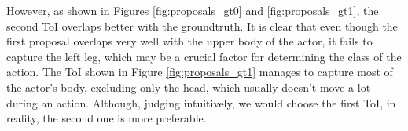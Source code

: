 However, as shown in Figures \ref{fig:proposals_gt0} and \ref{fig:proposals_gt1}, the second ToI overlaps better with the groundtruth. It is clear that even though
the first proposal overlaps very well with the upper body of the actor, it fails to capture the left leg, which may be a crucial factor for determining the class of the
action. The ToI shown in Figure \ref{fig:proposals_gt1} manages to capture most of the actor's body, excluding only the head, which usually doesn't move a lot
during an action. Although, judging intuitively, we would choose the first ToI, in reality, the second one is more preferable.

% 

